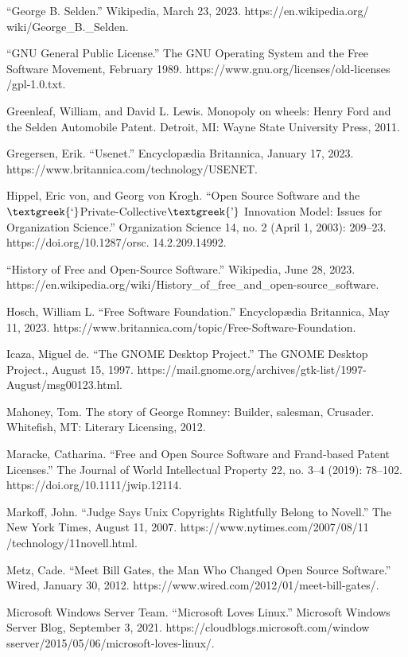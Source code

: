 \documentclass{article}
\begin{document}
“George B. Selden.” Wikipedia, March 23, 2023. https://en.wikipedia.org/ wiki/George\_B.\_Selden. 

“GNU General Public License.” The GNU Operating System and the Free Software Movement, February 1989.
https://www.gnu.org/licenses/old-licenses /gpl-1.0.txt. 

Greenleaf, William, and David L. Lewis. Monopoly on wheels: Henry Ford and the Selden Automobile Patent. Detroit, MI:
Wayne State University Press, 2011. 

Gregersen, Erik. “Usenet.” Encyclopædia Britannica, January 17, 2023. https://www.britannica.com/technology/USENET. 

Hippel, Eric von, and Georg von Krogh. “Open Source Software and the
$\text{\textgreek{‘}}$Private-Collective$\text{\textgreek{’}}$ Innovation Model: Issues for Organization Science.”
Organization Science 14, no. 2 (April 1, 2003): 209–23. https://doi.org/10.1287/orsc. 14.2.209.14992. 

“History of Free and Open-Source Software.” Wikipedia, June 28, 2023.
https://en.wikipedia.org/wiki/History\_of\_free\_and\_open-source\_software. 

Hosch, William L. “Free Software Foundation.” Encyclopædia Britannica, May 11, 2023.
https://www.britannica.com/topic/Free-Software-Foundation. 

Icaza, Miguel de. “The GNOME Desktop Project.” The GNOME Desktop Project., August 15, 1997.
https://mail.gnome.org/archives/gtk-list/1997-August/msg00123.html. 

Mahoney, Tom. The story of George Romney: Builder, salesman, Crusader. Whitefish, MT: Literary Licensing, 2012. 

Maracke, Catharina. “Free and Open Source Software and Frand‐based Patent Licenses.” The Journal of World Intellectual
Property 22, no. 3–4 (2019): 78–102. https://doi.org/10.1111/jwip.12114. 

Markoff, John. “Judge Says Unix Copyrights Rightfully Belong to Novell.” The New York Times, August 11, 2007.
https://www.nytimes.com/2007/08/11 /technology/11novell.html. 

Metz, Cade. “Meet Bill Gates, the Man Who Changed Open Source Software.” Wired, January 30, 2012.
https://www.wired.com/2012/01/meet-bill-gates/. 

Microsoft Windows Server Team. “Microsoft Loves Linux.” Microsoft Windows Server Blog, September 3, 2021.
https://cloudblogs.microsoft.com/window sserver/2015/05/06/microsoft-loves-linux/. 
\end{document}
